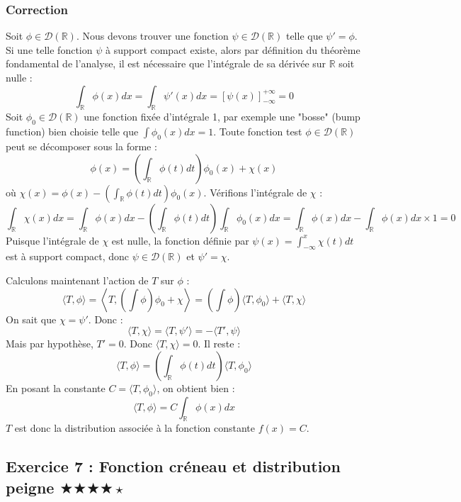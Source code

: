 \documentclass[11pt,a4paper]{article}
\begin{document}
\subsubsection*{Correction}
Soit $\phi \in \mathcal{D}(\mathbb{R})$.
Nous devons trouver une fonction $\psi \in \mathcal{D}(\mathbb{R})$ telle que $\psi' = \phi$.
Si une telle fonction $\psi$ à support compact existe, alors par définition du théorème fondamental de l'analyse, il est nécessaire que l'intégrale de sa dérivée sur $\mathbb{R}$ soit nulle :
$$ \int_{\mathbb{R}} \phi(x) dx = \int_{\mathbb{R}} \psi'(x) dx = [\psi(x)]_{-\infty}^{+\infty} = 0 $$
Soit $\phi_0 \in \mathcal{D}(\mathbb{R})$ une fonction fixée d'intégrale 1, par exemple une "bosse" (bump function) bien choisie telle que $\int \phi_0(x)dx = 1$.
Toute fonction test $\phi \in \mathcal{D}(\mathbb{R})$ peut se décomposer sous la forme :
$$ \phi(x) = \left( \int_{\mathbb{R}} \phi(t)dt \right) \phi_0(x) + \chi(x) $$
où $\chi(x) = \phi(x) - \left( \int_{\mathbb{R}} \phi(t)dt \right) \phi_0(x)$.
Vérifions l'intégrale de $\chi$ :
$$ \int_{\mathbb{R}} \chi(x) dx = \int_{\mathbb{R}} \phi(x) dx - \left( \int_{\mathbb{R}} \phi(t)dt \right) \int_{\mathbb{R}} \phi_0(x) dx = \int_{\mathbb{R}} \phi(x) dx - \int_{\mathbb{R}} \phi(x) dx \times 1 = 0 $$
Puisque l'intégrale de $\chi$ est nulle, la fonction définie par $\psi(x) = \int_{-\infty}^x \chi(t) dt$ est à support compact, donc $\psi \in \mathcal{D}(\mathbb{R})$ et $\psi' = \chi$.

Calculons maintenant l'action de $T$ sur $\phi$ :
$$ \langle T, \phi \rangle = \left\langle T, \left( \int \phi \right) \phi_0 + \chi \right\rangle = \left( \int \phi \right) \langle T, \phi_0 \rangle + \langle T, \chi \rangle $$
On sait que $\chi = \psi'$. Donc :
$$ \langle T, \chi \rangle = \langle T, \psi' \rangle = - \langle T', \psi \rangle $$
Mais par hypothèse, $T' = 0$. Donc $\langle T, \chi \rangle = 0$.
Il reste :
$$ \langle T, \phi \rangle = \left( \int_{\mathbb{R}} \phi(t)dt \right) \langle T, \phi_0 \rangle $$
En posant la constante $C = \langle T, \phi_0 \rangle$, on obtient bien :
$$ \langle T, \phi \rangle = C \int_{\mathbb{R}} \phi(x) dx $$
$T$ est donc la distribution associée à la fonction constante $f(x) = C$.


\subsection*{Exercice 7 : Fonction créneau et distribution peigne  \quad$\bigstar\bigstar\bigstar\bigstar\star$}
\end{document}
